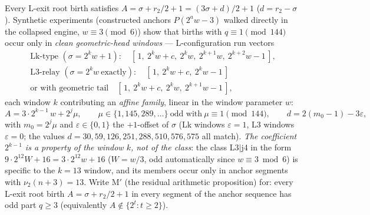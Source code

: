 \documentclass[11pt]{amsart}
\theoremstyle{definition}
\newcommand{\vtwo}[1]{\nu_2(#1)}
\begin{document}
Every L-exit root birth satisfies $A=\sigma+r_2/2+1=(3\sigma+d)/2+1$
($d=r_2-\sigma$). Synthetic experiments (constructed anchors $P(2^{a}w-3)$
walked directly in the collapsed engine, $w\equiv3\pmod6$) show that births
with $q\equiv1\pmod{144}$ occur only in \emph{clean geometric-head windows}
--- L-configuration run vectors
\begin{gather*}
\text{Lk-type }(\sigma=2^{k}w{+}1):\quad
[\,1,\ 2^{k}w{+}c,\ 2^{k}w,\ 2^{k+1}w,\ 2^{k+2}w{-}1\,],\\
\text{L3-relay }(\sigma=2^{k}w\ \text{exactly}):\quad
[\,1,\ 2^{k}w{+}c,\ 2^{k}w{-}1\,]\\
\text{or with geometric tail}\quad [\,1,\ 2^{k}w{+}c,\ 2^{k}w,\ 2^{k+1}w{-}1\,],
\end{gather*}
each window $k$ contributing an \emph{affine family}, linear in the window
parameter $w$:
\begin{equation}\label{eq:family}
A=3\cdot2^{k-1}\,w+2^{j}\mu,\qquad \mu\in\{1,145,289,\dots\}\ \text{odd
with}\ \mu\equiv1\!\pmod{144},\qquad d=2(m_0{-}1)-3\varepsilon,
\end{equation}
with $m_0=2^{j}\mu$ and $\varepsilon\in\{0,1\}$ the $+1$-offset of $\sigma$
(Lk windows $\varepsilon=1$, L3 windows $\varepsilon=0$; the values
$d=30,59,126,251,288,510,576,575$ all match). \emph{The coefficient
$2^{k-1}$ is a property of the window $k$, not of the class}: the class
L3$|$j4 in the form $9\cdot2^{12}W+16=3\cdot2^{12}w+16$ ($W=w/3$, odd
automatically since $w\equiv3\bmod6$) is specific to the $k=13$ window, and
its members occur only in anchor segments with $\vtwo{n+3}=13$. Write
\emph{$\mathrm{M'}$} (the residual arithmetic proposition) for: every L-exit
root birth $A=\sigma+r_2/2+1$ in every segment of the anchor sequence has
odd part $q\ge3$ (equivalently $A\notin\{2^{t}:t\ge2\}$).
\end{document}
